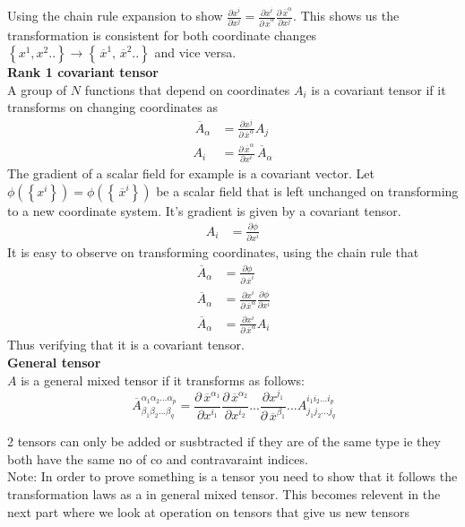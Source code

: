 \documentclass{article}
\newcommand{\note}[1]{\color{blue} Note: #1 \color{black}}
\newcommand{\set}[1]{ \left\{ #1 \right\} }
\newcommand{\olsi}[1]{\,\overline{\!{#1}}} %
\newcommand{\bx}{\olsi{x}}
\begin{document}
Using the chain rule expansion to show \(\frac{\partial x^i}{\partial x^j} =  \frac{\partial x^i}{\partial \bx^\alpha} \frac{\partial \bx^\alpha }{\partial x^j} \).
This shows us the transformation is consistent for both coordinate changes \(\set{x^1,x^2..}\to \set{\bx^1,\bx^2..} \) and vice versa. \\
\textbf{Rank 1 covariant tensor} \\
A group of \(N\) functions that depend on coordinates \(A_{i}\) is a covariant tensor if it transforms on changing coordinates as
\begin{align*}
    \olsi{A}_\alpha &= \frac{\partial x^j }{\partial \bx^\alpha}A_j \\
    A_i &= \frac{\partial \bx^\alpha }{\partial x^i}\olsi{A}_\alpha
\end{align*} 
The gradient of a scalar field for example is a covariant vector. Let \(\phi(\set{x^i}) = \phi(\set{\bx^i}) \) 
be a scalar field that is left unchanged on transforming to a new coordinate system. It's gradient is 
given by a covariant tensor. 
\begin{align*}
    A_i &= \frac{\partial \phi}{\partial x^i}
\end{align*}
It is easy to observe on transforming coordinates, using the chain rule that  
\begin{align*}
    \olsi{A}_\alpha &= \frac{\partial \phi}{\partial \bx^i} \\
    \olsi{A}_\alpha &= \frac{\partial x^i}{\partial \bx^\alpha}\frac{\partial \phi}{\partial x^i} \\
    \olsi{A}_\alpha &= \frac{\partial x^i}{\partial \bx^\alpha}A_i
\end{align*}
Thus verifying that it is a covariant tensor. 
\\
\textbf{General tensor} \\
\(A\) is a general mixed tensor if it transforms as follows: 
\begin{equation*}
    \olsi{A}_{\beta_1\beta_2...\beta_q}^{\alpha_1\alpha_2...\alpha_p} = \frac{\partial\bx^{\alpha_1}}{\partial x^{i_1}}\frac{\partial\bx^{\alpha_2}}{\partial x^{i_2}}...\frac{\partial x^{j_1}}{\partial \bx^{\beta_1}}...A_{j_1j_2...j_q}^{i_1i_2...i_p}
\end{equation*}

2 tensors can only be added or susbtracted if they are of the same type ie they both have the same no of co and contravaraint indices.\\

\note{In order to prove something is a tensor you need to show that it follows the transformation laws as a in general mixed tensor. This becomes relevent in the next part where we look at operation on tensors that give us new tensors} \\
\end{document}
